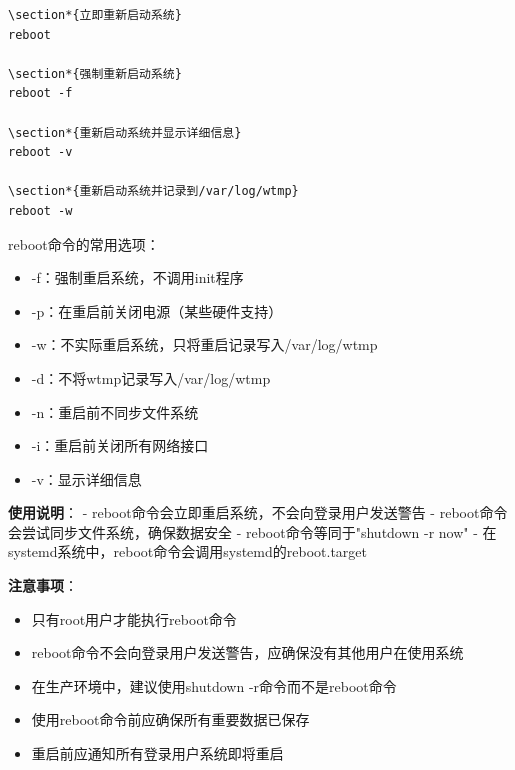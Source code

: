 \documentclass[12pt,UTF8]{ctexbook}
\begin{document}
\begin{verbatim}
\section*{立即重新启动系统}
reboot

\section*{强制重新启动系统}
reboot -f

\section*{重新启动系统并显示详细信息}
reboot -v

\section*{重新启动系统并记录到/var/log/wtmp}
reboot -w
\end{verbatim}

reboot命令的常用选项：
\begin{itemize}
    \item -f：强制重启系统，不调用init程序
    \item -p：在重启前关闭电源（某些硬件支持）
    \item -w：不实际重启系统，只将重启记录写入/var/log/wtmp
    \item -d：不将wtmp记录写入/var/log/wtmp
    \item -n：重启前不同步文件系统
    \item -i：重启前关闭所有网络接口
    \item -v：显示详细信息
\end{itemize}

\textbf{使用说明}：
- reboot命令会立即重启系统，不会向登录用户发送警告
- reboot命令会尝试同步文件系统，确保数据安全
- reboot命令等同于"shutdown -r now"
- 在systemd系统中，reboot命令会调用systemd的reboot.target

\textbf{注意事项}：
\begin{itemize}
    \item 只有root用户才能执行reboot命令
    \item reboot命令不会向登录用户发送警告，应确保没有其他用户在使用系统
    \item 在生产环境中，建议使用shutdown -r命令而不是reboot命令
    \item 使用reboot命令前应确保所有重要数据已保存
    \item 重启前应通知所有登录用户系统即将重启
\end{itemize}
\end{document}
